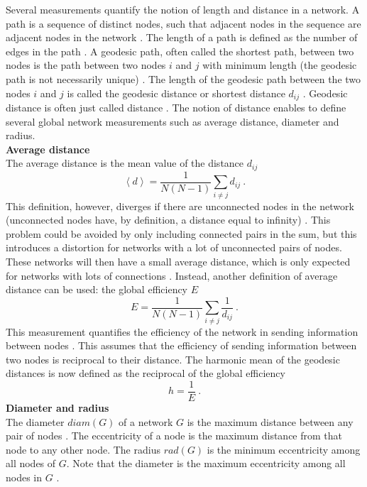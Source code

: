 \documentclass[11 pt , letterpaper , twoside , openright]{book}
\begin{document}
Several measurements quantify the notion of length and distance in a network. A path is a sequence of distinct nodes, such that adjacent nodes in the sequence are adjacent nodes in the network \cite{Goddard2010}. The length of a path is defined as the number of edges in the path \cite{Goddard2010}. A geodesic path, often called the shortest path, between two nodes is the path between two nodes $i$ and $j$ with minimum length (the geodesic path is not necessarily unique) \cite{F.Costa2007}. The length of the geodesic path between the two nodes $i$ and $j$ is called the geodesic distance or shortest distance $d_{ij}$ \cite{F.Costa2007}. Geodesic distance is often just called distance \cite{Goddard2010}. The notion of distance enables to define several global network measurements such as average distance, diameter and radius.\\  
\newline
\textbf{Average distance}\\
\newline
The average distance is the mean value of the distance $d_{ij}$ \cite{F.Costa2007}
\begin{equation}\label{avdist}
	\left<d\right> = \frac{1}{N(N-1)} \sum_{i \neq j} d_{ij} \ .
\end{equation}
This definition, however, diverges if there are unconnected nodes in the network (unconnected nodes have, by definition, a distance equal to infinity) \cite{F.Costa2007}. This problem could be avoided by only including connected pairs in the sum, but this introduces a distortion for networks with a lot of unconnected pairs of nodes. These networks will then have a small average distance, which is only expected for networks with lots of connections \cite{F.Costa2007}. Instead, another definition of average distance can be used: the global efficiency $E$ \cite{F.Costa2007}
\begin{equation}
	E = \frac{1}{N(N-1)} \sum_{i \neq j} \frac{1}{d_{ij}} \ .
\end{equation}
This measurement quantifies the efficiency of the network in sending information between nodes \cite{F.Costa2007}. This assumes that the efficiency of sending information between two nodes is reciprocal to their distance. The harmonic mean of the geodesic distances is now defined as the reciprocal of the global efficiency \cite{F.Costa2007}
\begin{equation}
 	h = \frac{1}{E} \ .
\end{equation}
\newline
\textbf{Diameter and radius}\\
\newline
The diameter $diam(G)$ of a network $G$ is the maximum distance between any pair of nodes \cite{Goddard2010}. The eccentricity of a node is the maximum distance from that node to any other node. The radius $rad(G)$ is the minimum eccentricity among all nodes of $G$. Note that the diameter is the maximum eccentricity among all nodes in $G$ \cite{Goddard2010}.
\newpage
\noindent
\end{document}
